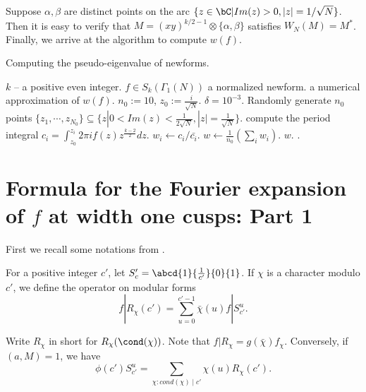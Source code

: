 \documentclass [11pt, proquest] {uwthesis}[2015/03/03]
\begin{document}
Suppose $\alpha, \beta$ are distinct points on the arc $\{z \in \bC | Im(z) > 0,  |z| = 1/\sqrt{N}\}$. Then it is easy to verify that $M = (xy)^{k/2-1} \otimes \{\alpha, \beta\}$ satisfies $W_N(M) = M^*$. Finally, we arrive at the algorithm to compute $w(f)$.




\begin{algorithm}[H] 
\caption{Computing the pseudo-eigenvalue of newforms.}
\label{alg: pseudo-eigenvalue}
\begin{algorithmic}[1]
    \Require $k$ -- a positive even integer. $f \in S_k(\Gamma_1(N))$ a normalized newform.    
    \Ensure a numerical approximation of $w(f)$.
    \State $n_0 := 10$, $z_0 := \frac{i}{\sqrt{N}}$. $\delta = 10^{-3}$. 
    \State Randomly generate $n_0$ points $\{z_1, \cdots, z_{N_0}\} \subseteq \{z | 0 < Im(z) < \frac{1}{2\sqrt{N}}, |z| = \frac{1}{\sqrt{N}} \}$.
    	\State compute the period integral $c_i =  \int_{z_0}^{z_i} 2\pi i f(z) z^{\frac{k-2}{2}} dz$. 
	\State $w_i \gets c_i/\bar{c_i}$. 
    \EndFor
     \State $w \gets \frac{1}{n_0}(\sum_i w_i)$. 
     \State \Return $w$.
    \Else
    	\State {}. 
    \EndIf
\end{algorithmic}
\end{algorithm}



\section{Formula for the Fourier expansion of $f$ at width one cusps: Part 1}

First we recall some notations from \cite{atkin1978twists}.
\begin{Definition}
For a positive integer $c'$, let $S_c' = \abcd{1}{\frac{1}{c'}}{0}{1}$. If $\chi$ is a character modulo $c'$, we define the 
operator on modular forms 
\begin{equation*}
\label{formula: RS}
	f | R_\chi(c') = \sum_{u =0}^{c'-1} \bar{\chi}(u) f | S_{c'}^u.
\end{equation*}
\end{Definition}
Write $R_\chi$ in short for $R_\chi(\cond(\chi))$. Note that $f|R_\chi = g(\bar{\chi})f_\chi$.
Conversely, if $(a,M) = 1$, we have 
\begin{equation}
\label{formula: SR}
	\phi(c')S_{c'}^u = \sum_{\chi: cond(\chi) \mid c'} \chi(u) R_\chi(c').
\end{equation}
\end{document}
